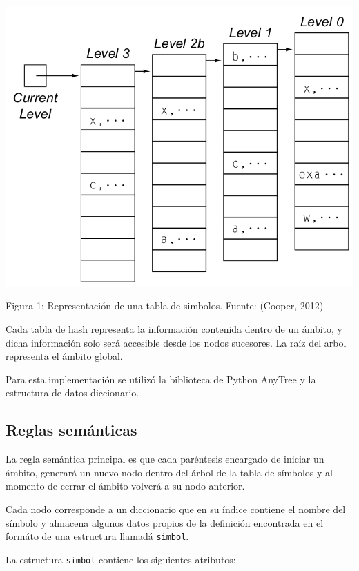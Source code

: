 \documentclass[12pt]{article}
\begin{document}
\centerline{\includegraphics[trim={0 9cm 0 0},scale=0.45]{SYmTabex.png}}
\centerline{Figura 1: Representaci\'on de una tabla de simbolos. Fuente: (Cooper, 2012)}

Cada tabla de hash representa la informaci\'on contenida dentro de un \'ambito, y dicha informaci\'on solo ser\'a accesible desde los nodos sucesores. La ra\'iz del arbol representa el \'ambito global. 

Para esta implementaci\'on se utiliz\'o la biblioteca de Python AnyTree y la estructura de datos diccionario.


\subsection*{Reglas sem\'anticas}

La regla sem\'antica principal es que cada par\'entesis encargado de iniciar un \'ambito, generar\'a un nuevo nodo dentro del \'arbol de la tabla de s\'imbolos y al momento de cerrar el \'ambito volver\'a a su nodo anterior.

Cada nodo corresponde a un diccionario que en su \'indice contiene el nombre del s\'imbolo y almacena algunos datos propios de la definici\'on encontrada en el form\'ato de una estructura llamad\'a \texttt{simbol}. 

La estructura \texttt{simbol} contiene los siguientes atributos:
\end{document}
